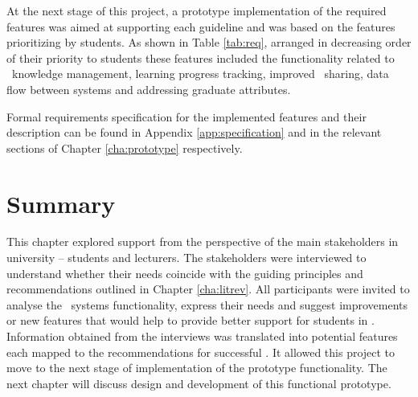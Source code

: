At the next stage of this project, a prototype implementation of the required
features was aimed at supporting each guideline and was based on the features
prioritizing by students. As shown in Table \ref{tab:req}, arranged in
decreasing order of their priority to students these features included the
functionality related to \ep~knowledge management, learning progress tracking,
improved \ep~sharing, data flow between systems and addressing graduate
attributes.

Formal requirements specification for the implemented features and their
description can be found in Appendix \ref{app:specification} and in the relevant
sections of Chapter \ref{cha:prototype} respectively.

\section{Summary}

This chapter explored \LLLs support from the perspective of the main
stakeholders in university -- students and lecturers. The stakeholders were
interviewed to understand whether their needs coincide with the guiding
principles and recommendations outlined in Chapter \ref{cha:litrev}. All
participants were invited to analyse the \ep~systems functionality, express
their needs and suggest improvements or new features that would help to provide
better support for students in \LLLsn. Information obtained from the interviews
was translated into potential features each mapped to the recommendations for
successful \LLLsn. It allowed this project to move to the next stage of
implementation of the prototype functionality. The next chapter will discuss
design and development of this functional prototype.
